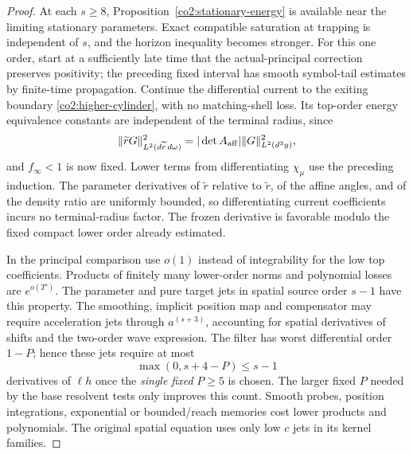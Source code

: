 \begin{proof}
At each $s\ge8$, Proposition~\ref{co2:stationary-energy} is available near
the limiting stationary parameters.  Exact compatible saturation at trapping
is independent of $s$, and the horizon inequality becomes stronger.  For
this one order, start at a sufficiently late time that the actual-principal
correction preserves positivity; the preceding fixed interval has smooth
symbol-tail estimates by finite-time propagation.  Continue the differential
current to the exiting boundary \eqref{co2:higher-cylinder}, with no
matching-shell loss.  Its top-order energy equivalence constants are
independent of the terminal radius, since
\begin{equation}\label{co2:affine-density}
 \|\widetilde r G\|_{L^2(d\widetilde r\,d\omega)}^2
       =|\det A_{\rm aff}|\|G\|_{L^2(d^3y)}^2,
\end{equation}
and $f_\infty<1$ is now fixed.  Lower terms from differentiating
$\chi_\mu$ use the preceding induction.  The parameter derivatives of
$\widetilde r$ relative to $\widetilde r$, of the affine angles, and of
the density ratio are uniformly bounded, so differentiating current
coefficients incurs no terminal-radius factor.  The frozen derivative is
favorable modulo the fixed compact lower order already estimated.

In the principal comparison use $o(1)$ instead of integrability for the low
top coefficients.  Products of finitely many lower-order norms and polynomial
losses are $e^{o(T')}$.  The parameter and pure target jets in spatial
source order $s-1$ have this property.  The smoothing, implicit position map
and compensator may require acceleration jets through $a^{(s+3)}$, accounting
for spatial derivatives of shifts and the two-order wave expression.  The
filter has worst differential order $1-P$; hence these jets require at most
\begin{equation}\label{co2:filter-count}
 \max(0,s+4-P)\le s-1
\end{equation}
derivatives of $\ell h$ once the \emph{single fixed} $P\ge5$ is chosen.
The larger fixed $P$ needed by the base resolvent tests only improves this
count.  Smooth probes, position integrations, exponential or bounded/reach
memories cost lower products and polynomials.  The original spatial equation
uses only low $c$ jets in its kernel families.


\end{proof}
